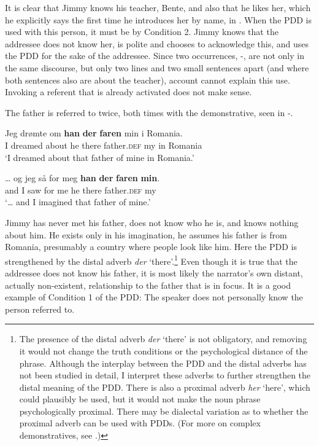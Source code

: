 \documentclass[output=paper,colorlinks,citecolor=brown]{langscibook}
\begin{document}
It is clear that Jimmy knows his teacher, Bente, and also that he likes her, which he explicitly says the first time he introduces her by name, in . When the PDD is used with this person, it must be by Condition 2. Jimmy knows that the addressee does not know her, is polite and chooses to acknowledge this, and uses the PDD for the sake of the addressee. Since two occurrences, -, are not only in the same discourse, but only two lines and two small sentences apart (and where both sentences also are about the teacher),  account cannot explain this use. Invoking a referent that is already activated does not make sense.

The father is referred to twice, both times with the demonstrative, seen in -.

\ea\label{ex:johannessen:20}
 \gll Jeg drømte om \textbf{han} \textbf{der} \textbf{faren} min i Romania.\\
     I dreamed about he there father.\textsc{def} my in Romania \\
\glt ‘I dreamed about that father of mine in Romania.’ \citep[56, bottom]{Rishoi2014}
\z

\ea\label{ex:johannessen:21}
 \gll … og jeg så for meg \textbf{han} \textbf{der} \textbf{faren} \textbf{min}.\\
     {} and I saw for me he there father.\textsc{def} my\\
\glt ‘… and I imagined that father of mine.’ \citep[65]{Rishoi2014}
\z

Jimmy has never met his father, does not know who he is, and knows nothing about him. He exists only in his imagination, he assumes his father is from Romania, presumably a country where people look like him. Here the PDD is strengthened by the distal adverb \textit{der} ‘there’.\footnote{The presence of the distal adverb \textit{der} ‘there’ is not obligatory, and removing it would not change the truth conditions or the psychological distance of the phrase. Although the interplay between the PDD and the distal adverbs has not been studied in detail, I interpret these adverbs to further strengthen the distal meaning of the PDD. There is also a proximal adverb \textit{her} ‘here’, which could plausibly be used, but it would not make the noun phrase psychologically proximal. There may be dialectal variation as to whether the proximal adverb can be used with PDDs. (For more on complex demonstratives, see \citealt{Vindenes2017}.)} Even though it is true that the addressee does not know his father, it is most likely the narrator’s own distant, actually non-existent, relationship to the father that is in focus. It is a good example of Condition 1 of the PDD: The speaker does not personally know the person referred to.
\end{document}
